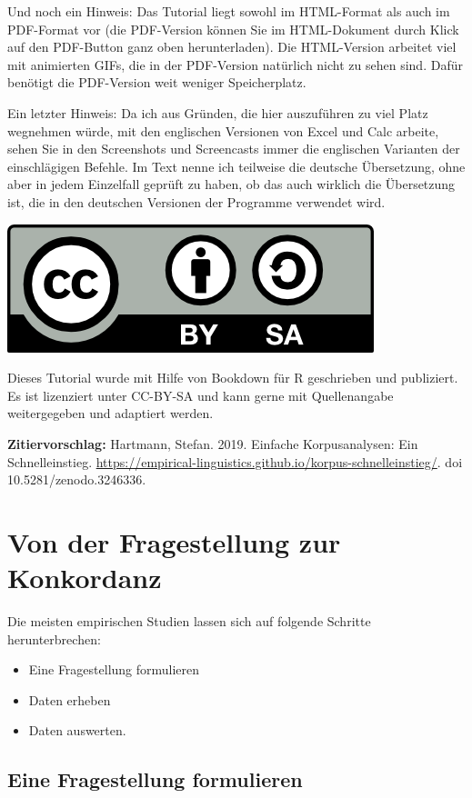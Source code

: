 \documentclass[]{article}
\providecommand{\tightlist}{%
  \setlength{\itemsep}{0pt}\setlength{\parskip}{0pt}}
\begin{document}
Und noch ein Hinweis: Das Tutorial liegt sowohl im HTML-Format als auch
im PDF-Format vor (die PDF-Version können Sie im HTML-Dokument durch
Klick auf den PDF-Button ganz oben herunterladen). Die HTML-Version
arbeitet viel mit animierten GIFs, die in der PDF-Version natürlich
nicht zu sehen sind. Dafür benötigt die PDF-Version weit weniger
Speicherplatz.

Ein letzter Hinweis: Da ich aus Gründen, die hier auszuführen zu viel
Platz wegnehmen würde, mit den englischen Versionen von Excel und Calc
arbeite, sehen Sie in den Screenshots und Screencasts immer die
englischen Varianten der einschlägigen Befehle. Im Text nenne ich
teilweise die deutsche Übersetzung, ohne aber in jedem Einzelfall
geprüft zu haben, ob das auch wirklich die Übersetzung ist, die in den
deutschen Versionen der Programme verwendet wird.

\begin{center}\includegraphics[width=0.3\linewidth,height=0.3\textheight]{docs/fig/by-sa} \end{center}

Dieses Tutorial wurde mit Hilfe von Bookdown für R geschrieben und
publiziert. Es ist lizenziert unter CC-BY-SA und kann gerne mit
Quellenangabe weitergegeben und adaptiert werden.

\textbf{Zitiervorschlag:} Hartmann, Stefan. 2019. Einfache
Korpusanalysen: Ein Schnelleinstieg.
\url{https://empirical-linguistics.github.io/korpus-schnelleinstieg/}.
doi 10.5281/zenodo.3246336.

\section{Von der Fragestellung zur
Konkordanz}\label{von-der-fragestellung-zur-konkordanz}

Die meisten empirischen Studien lassen sich auf folgende Schritte
herunterbrechen:

\begin{itemize}
\tightlist
\item
  Eine Fragestellung formulieren
\item
  Daten erheben
\item
  Daten auswerten.
\end{itemize}

\subsection{Eine Fragestellung
formulieren}\label{eine-fragestellung-formulieren}
\end{document}
